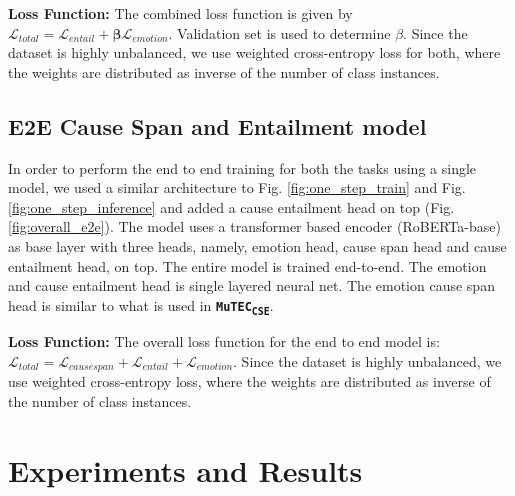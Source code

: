 \documentclass{article}
\newcommand{\subone}{\textbf{\texttt{MuTEC\textsubscript{CSE}}}}
\begin{document}
\noindent\textbf{Loss Function:} The combined loss function is given by $\mathcal{L}_{total} = \mathcal{L}_{entail} + \mathbf{\beta}\mathcal{L}_{emotion}$. Validation set is used to determine $\beta$. Since the dataset is highly unbalanced, we use weighted cross-entropy loss for both, where the weights are distributed as inverse of the number of class instances.
\subsection{E2E Cause Span and Entailment model}

In order to perform the end to end training for both the tasks using a single model, we used a similar architecture to Fig. \ref{fig:one_step_train} and Fig. \ref{fig:one_step_inference} and added a cause entailment head on top (Fig. \ref{fig:overall_e2e}). The model uses a transformer based encoder (RoBERTa-base) as base layer with three heads, namely, emotion head, cause span head and cause entailment head, on top. The entire model is trained end-to-end. The emotion and cause entailment head is single layered neural net. The emotion cause span head is similar to what is used in \subone. 

\noindent\textbf{Loss Function:} The overall loss function for the end to end model is: $\mathcal{L}_{total} = \mathcal{L}_{causespan} + \mathcal{L}_{entail} + \mathcal{L}_{emotion}$. Since the dataset is highly unbalanced, we use weighted cross-entropy loss, where the weights are distributed as inverse of the number of class instances. \section{Experiments and Results} \label{sec:experiments}
\vspace{-3mm}
\end{document}
